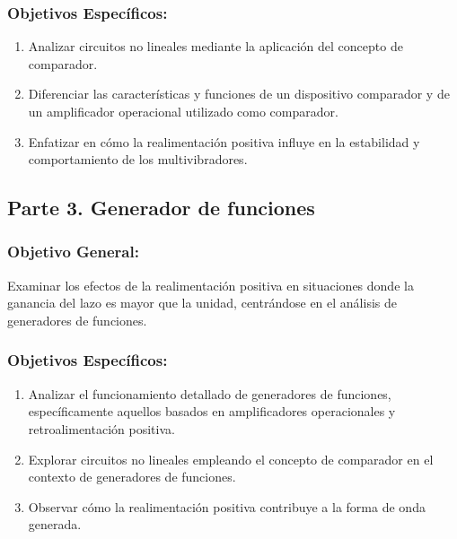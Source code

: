         \subsubsection*{Objetivos Específicos:}
        \begin{enumerate}
            \item Analizar circuitos no lineales mediante la aplicación del concepto de comparador.
            \item Diferenciar las características y funciones de un dispositivo comparador y de un amplificador operacional utilizado como comparador.
            \item Enfatizar en cómo la realimentación positiva influye en la estabilidad y comportamiento de los multivibradores.
        \end{enumerate}
    
    \subsection*{Parte 3. Generador de funciones}
    
        \subsubsection*{Objetivo General:}
        Examinar los efectos de la realimentación positiva en situaciones donde la ganancia del lazo es mayor que la unidad, centrándose en el análisis de generadores de funciones.
        
        \subsubsection*{Objetivos Específicos:}
        \begin{enumerate}
            \item Analizar el funcionamiento detallado de generadores de funciones, específicamente aquellos basados en amplificadores operacionales y retroalimentación positiva.
            \item Explorar circuitos no lineales empleando el concepto de comparador en el contexto de generadores de funciones.
            \item Observar cómo la realimentación positiva contribuye a la forma de onda generada.
        \end{enumerate}

    

\newpage